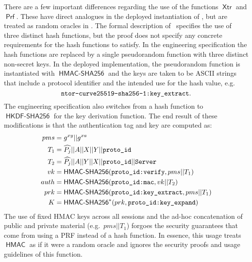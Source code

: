 \documentclass[USenglish,oneside,twocolumn]{article}
\theoremstyle{dgthm}
\theoremstyle{dgdef}
\newcommand{\ntor}{{\sf {ntor}}}
\newcommand{\con}{||}
\newcommand{\AlgorithmName}[1]{\operatorname{\mathsf{#1}}}
\newcommand{\PRF}{\AlgorithmName{Prf}}
\newcommand{\XTR}{\AlgorithmName{Xtr}}
\newcommand{\HMAC}{\AlgorithmName{HMAC}}
\newcommand{\HMACS}{\AlgorithmName{HMAC-SHA256}}
\newcommand{\HKDFS}{\AlgorithmName{HKDF-SHA256}}
\newcommand{\Token}[1]{\textnormal{\tt{#1}}}
\begin{document}
  There are a few important differences regarding the use of the functions
  $\XTR$ and $\PRF$. These have direct analogues in the deployed instantiation
  of \ntor, but are treated as random oracles in \cite{GoldbergSU13}.  The
  formal description of \ntor~specifies the use of three distinct hash
  functions, but the proof does not specify any concrete requirements for the
  hash functions to satisfy. In the engineering specification
  \cite{TorPropNtor} the hash functions are replaced by a single
  pseudorandom function with three distinct non-secret keys.  In the deployed
  implementation, the pseudorandom function is instantiated with
  $\HMACS$ and the keys are taken to be ASCII strings that
  include a protocol identifier and the intended use for the hash value, e.g.
  \[\Token{ntor-curve25519-sha256-1:key\_extract}.\] The engineering
  specification also switches from a hash function to
  $\HKDFS$ for the key derivation function.  The end
  result of these modifications is that the authentication tag and key are
  computed as:
  \begin{align*}
    pms &= g^{xy} \con g^{xa}\\
    T_1 &= \widehat{P_j} \con A \con X \con Y \con \Token{proto\_id}\\
    T_2 &= \widehat{P_j} \con A \con Y \con X \con \Token{proto\_id} \con \Token{Server}\\
    vk &= \HMACS(\Token{proto\_id:verify}, pms \con T_1)\\
    auth &= \HMACS(\Token{proto\_id:mac}, vk \con T_2)\\
    prk &= \HMACS(\Token{proto\_id:key\_extract}, pms\con T_1)\\
    K &= \HMACS^*(prk, \Token{proto\_id:key\_expand})\\
  \end{align*}
  The use of fixed HMAC keys across all sessions and the ad-hoc concatenation
  of public and private material (e.g.~$pms\con T_1$) forgoes the security
  guarantees that come from using a PRF instead of a hash function.
  In essence, this usage treats $\HMAC$ as if it were a random oracle
  and ignores the security proofs and usage guidelines of this function.
\end{document}
